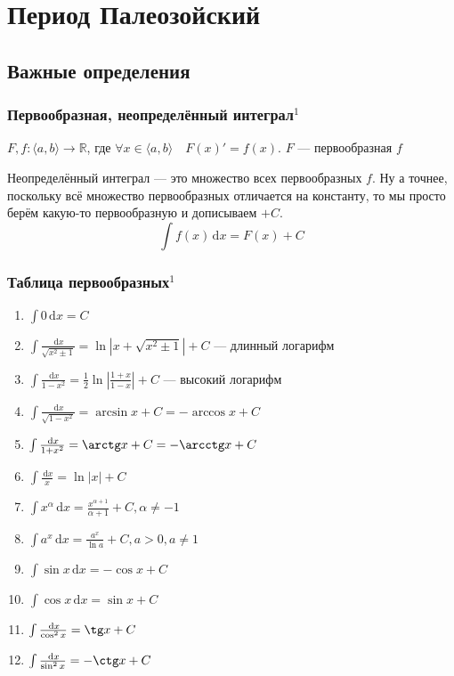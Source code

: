 \documentclass{article}
\def\D{\,\mathrm{d}}
\begin{document}
\section{Период Палеозойский}
\subsection{Важные определения}
\subsubsection{Первообразная, неопределённый интеграл\texorpdfstring{$^1$}{}}
$F, f: \langle a, b \rangle \rightarrow \mathbb{R}$, где $\forall x \in \langle a, b \rangle \quad F(x)' = f(x)$. $F$ --- первообразная $f$

Неопределённый интеграл --- это множество всех первообразных $f$. Ну а точнее, поскольку всё множество первообразных отличается на константу, то мы просто берём какую-то первообразную и дописываем $+C$.
$$
\int f(x) \D{x} = F(x) + C
$$

\subsubsection{Таблица первообразных\texorpdfstring{$^1$}{}}
\begin{enumerate}
    \item $\int 0 \D x = C$
    \item $\int \frac{\D x}{\sqrt{x^2\pm 1}} = \ln |x + \sqrt{x^2 \pm 1}| + C$ --- длинный логарифм
    \item $\int \frac{\D x}{1 - x^2} = \frac{1}{2}\ln|\frac{1+x}{1-x}| + C$ --- высокий логарифм
    \item $\int \frac{\D x}{\sqrt{1-x^2}} = \arcsin x + C = - \arccos x + C$
    \item $\int \frac{\D x}{1 + x^2} = \arctg x + C = - \arcctg x + C$
    \item $\int \frac{\D x}{x} = \ln |x| + C$
    \item $\int x^\alpha \D x = \frac{x ^ {\alpha + 1}}{\alpha + 1} + C, \alpha \ne -1$
    \item $\int a^x \D x = \frac{a^x}{\ln a} + C, a > 0, a \ne 1$
    \item $\int \sin x \D x = -\cos x + C$
    \item $\int\cos x \D x = \sin x + C$
    \item $\int\frac{\D x}{\cos^2 x} = \tg x + C$
    \item $\int\frac{\D x}{\sin^2 x} = - \ctg x + C$
\end{enumerate}
\end{document}
